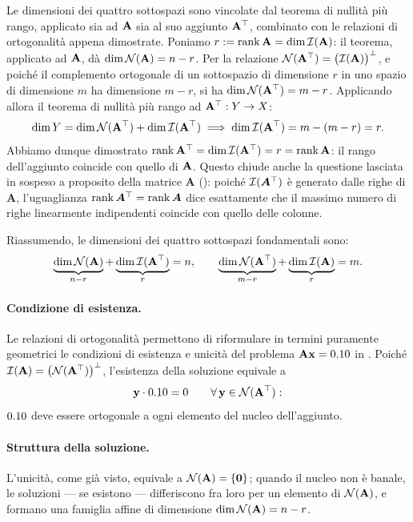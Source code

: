 Le dimensioni dei quattro sottospazi sono vincolate dal teorema di nullit\`a pi\`u rango, applicato sia ad $\mathbf{A}$ sia al suo aggiunto $\mathbf{A}^\top$, combinato con le relazioni di ortogonalit\`a appena dimostrate. Poniamo $r:=\operatorname{rank}\mathbf{A}=\dim\mathcal{I}(\mathbf{A})$: il teorema, applicato ad $\mathbf{A}$, d\`a $\dim\mathcal{N}(\mathbf{A})=n-r$. Per la relazione $\mathcal{N}(\mathbf{A}^\top)=\bigl(\mathcal{I}(\mathbf{A})\bigr)^\perp$, e poich\'e il complemento ortogonale di un sottospazio di dimensione $r$ in uno spazio di dimensione $m$ ha dimensione $m-r$, si ha $\dim\mathcal{N}(\mathbf{A}^\top)=m-r$. Applicando allora il teorema di nullit\`a pi\`u rango ad $\mathbf{A}^\top:Y\to X$:
\begin{equation}
	\dim Y=\dim\mathcal{N}(\mathbf{A}^\top)+\dim\mathcal{I}(\mathbf{A}^\top) \;\Longrightarrow\; \dim\mathcal{I}(\mathbf{A}^\top)=m-(m-r)=r.
\end{equation}
Abbiamo dunque dimostrato $\operatorname{rank}\mathbf{A}^\top=\dim\mathcal{I}(\mathbf{A}^\top)=r=\operatorname{rank}\mathbf{A}$: il rango dell'aggiunto coincide con quello di $\mathbf{A}$. Questo chiude anche la questione lasciata in sospeso a proposito della matrice $\bm A$ (): poich\'e $\mathcal{I}(\bm A^\top)$ \`e generato dalle righe di $\bm A$, l'uguaglianza $\operatorname{rank}\bm A^\top=\operatorname{rank}\bm A$ dice esattamente che il massimo numero di righe linearmente indipendenti coincide con quello delle colonne.

Riassumendo, le dimensioni dei quattro sottospazi fondamentali sono:
\begin{equation}\label{eq:dim_4spazi}
	\underbrace{\dim\mathcal{N}(\mathbf{A})}_{n-r} + \underbrace{\dim\mathcal{I}(\mathbf{A}^\top)}_{r} = n, \qquad
	\underbrace{\dim\mathcal{N}(\mathbf{A}^\top)}_{m-r} + \underbrace{\dim\mathcal{I}(\mathbf{A})}_{r} = m.
\end{equation}




\paragraph{Condizione di esistenza.}\label{sec:rilettura_classificazione}
Le relazioni di ortogonalità permettono di riformulare in termini puramente geometrici le condizioni di esistenza e unicità del problema $\mathbf{A}\mathbf{x}=0.10$ in . Poiché $\mathcal{I}(\mathbf{A})=\bigl(\mathcal{N}(\mathbf{A}^\top)\bigr)^\perp$, l'esistenza della soluzione equivale a
\begin{equation}\label{eq:compatibilita}
	\mathbf{y}\cdot0.10=0 \qquad \forall\,\mathbf{y}\in\mathcal{N}(\mathbf{A}^\top):
\end{equation}
$0.10$ deve essere ortogonale a ogni elemento del nucleo dell'aggiunto.

\paragraph{Struttura della soluzione.}
L'unicità, come già visto, equivale a $\mathcal{N}(\mathbf{A})=\{\mathbf{0}\}$; quando il nucleo non è banale, le soluzioni --- se esistono --- differiscono fra loro per un elemento di $\mathcal{N}(\mathbf{A})$, e formano una famiglia affine di dimensione $\dim\mathcal{N}(\mathbf{A})=n-r$.




